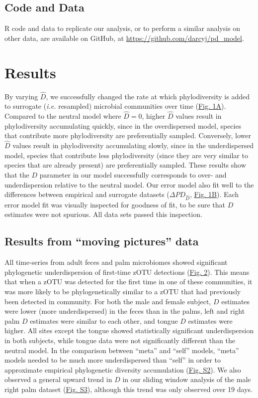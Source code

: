\documentclass{article}
\begin{document}
\subsection{Code and Data} \label{sec:codeAndData}
R code and data to replicate our analysis, or to perform a similar analysis on other data, are available on GitHub, at \url{https://github.com/darcyj/pd_model}. 


\section{Results} \label{sec:results}
By varying \(\hat{D}\), we successfully changed the rate at which phylodiversity is added to surrogate (\emph{i.e.} resampled) microbial communities over time (\hyperref[sec:figure1]{Fig. 1A}). Compared to the neutral model where \(\hat{D} = 0\), higher \(\hat{D}\) values result in phylodiversity accumulating quickly, since in the overdispersed model, species that contribute more phylodiversity are preferentially sampled. Conversely, lower \(\hat{D}\) values result in phylodiversity accumulating slowly, since in the underdispersed model, species that contribute less phylodiversity (since they are very similar to species that are already present) are preferentially sampled. These results show that the \(D\) parameter in our model successfully corresponds to over- and underdispersion relative to the neutral model. Our error model also fit well to the differences between empirical and surrogate datasets (\(\Delta PD_{\hat{D}}\), \hyperref[sec:figure1]{Fig. 1B}). Each error model fit was visually inspected for goodness of fit, to be sure that \(D\) estimates were not spurious. All data sets passed this inspection.

\subsection{Results from “moving pictures” data}
All time-series from adult feces and palm microbiomes \cite{Caporaso2011} showed significant phylogenetic underdispersion of first-time zOTU detections (\hyperref[sec:figure2]{Fig. 2}). This means that when a zOTU was detected for the first time in one of these communities, it was more likely to be phylogenetically similar to a zOTU that had previously been detected in community. For both the male and female subject, \(D\) estimates were lower (more underdispersed) in the feces than in the palms, left and right palm \(D\) estimates were similar to each other, and tongue \(D\) estimates were higher. All sites except the tongue showed statistically significant underdispersion in both subjects, while tongue data were not significantly different than the neutral model. In the comparison between “meta” and “self” models, “meta” models needed to be much more underdispersed than “self” in order to approximate empirical phylogenetic diversity accumulation (\hyperref[sec:figureS2]{Fig. S2}). We also observed a general upward trend in \(D\) in our sliding window analysis of the male right palm dataset (\hyperref[sec:figureS3]{Fig. S3}), although this trend was only observed over 19 days.
\end{document}
